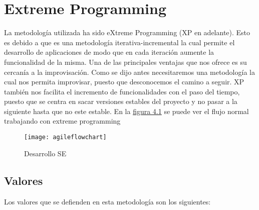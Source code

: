 \section{Extreme Programming}

La metodología utilizada ha sido eXtreme Programming (XP en adelante). Esto es debido a que es una
metodología iterativa-incremental la cual permite el desarrollo de aplicaciones de modo que en cada
iteración aumente la funcionalidad de la misma. Una de las principales ventajas que nos ofrece
es su cercanía a la improvisación. Como se dijo antes necesitaremos una metodología la cual
nos permita improvisar, puesto que desconocemos el camino a seguir. XP también nos facilita
el incremento de funcionalidades con el paso del tiempo, puesto que se centra en sacar versiones
estables del proyecto y no pasar a la siguiente hasta que no este estable. En la \hyperref[fig:Desarrollo Sistema Experto]{figura 4.1} se
puede ver el flujo normal trabajando con extreme programming


\begin{figure}[htb]
  \centering
    \texttt{[image: agileflowchart]}
  \caption[Desarrollo SE]{Desarrollo SE}
  \label{fig:Desarrollo Sistema Experto}
\end{figure}



\subsection{Valores}

Los valores que se defienden en esta metodología son los siguientes:

